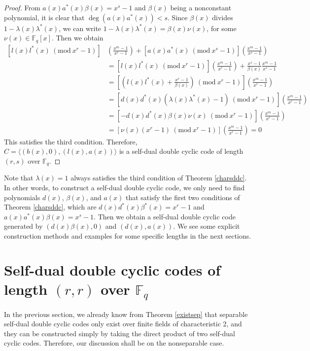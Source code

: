\documentclass[12pt]{article}
\newcommand{\Mod}[1]{\ (\mathrm{mod}\ #1)}
\begin{document}
\begin{proof}
		From $a(x)a^{*}(x)\beta(x)=x^s-1$ and $\beta(x)$ being a nonconstant polynomial, it is clear that $\deg(a(x)a^{*}(x))<s$. Since $\beta(x)$ divides $1-\lambda(x)\lambda^{*}(x)$, we can write $1-\lambda(x)\lambda^{*}(x)=\beta(x)\nu(x)$, for some $\nu(x)\in\mathbb{F}_q[x]$. Then we obtain
		\begin{align*}
			\left[l(x)l^{*}(x)\Mod{x^r-1}\right]&\left(\frac{x^m-1}{x^r-1}\right)+\left[a(x)a^{*}(x)\Mod{x^s-1}\right]\left(\frac{x^m-1}{x^s-1}\right)\\
			&=\left[l(x)l^{*}(x)\Mod{x^r-1}\right]\left(\frac{x^m-1}{x^r-1}\right)+\frac{x^s-1}{\beta(x)}\frac{x^m-1}{x^s-1}\\
			&=\left[\left(l(x)l^{*}(x)+\frac{x^r-1}{\beta(x)}\right)\Mod{x^r-1}\right]\left(\frac{x^m-1}{x^r-1}\right)\\
			&=\left[d(x)d^{*}(x)(\lambda(x)\lambda^{*}(x)-1)\Mod{x^r-1}\right]\left(\frac{x^m-1}{x^r-1}\right)\\
			&=\left[-d(x)d^{*}(x)\beta(x)\nu(x)\Mod{x^r-1}\right]\left(\frac{x^m-1}{x^r-1}\right)\\
			&=\left[\nu(x)(x^r-1)\Mod{x^r-1}\right]\left(\frac{x^m-1}{x^r-1}\right)=0
		\end{align*}
		This satisfies the third condition. Therefore, $C=\langle (b(x),0),(l(x),a(x))\rangle$ is a self-dual double cyclic code of length $(r,s)$ over $\mathbb{F}_q$.
	\end{proof}
	
	Note that $\lambda(x)=1$ always satisfies the third condition of Theorem \ref{charsddc}. In other words, to construct a self-dual double cyclic code, we only need to find polynomials $d(x)$, $\beta(x)$, and $a(x)$ that satisfy the first two conditions of Theorem \ref{charsddc}, which are $d(x)d^{*}(x)\beta^{*}(x)=x^r-1$ and $a(x)a^{*}(x)\beta(x)=x^s-1$. Then we obtain a self-dual double cyclic code generated by $(d(x)\beta(x),0)$ and $(d(x),a(x))$. We see some explicit construction methods and examples for some specific lengths in the next sections.
	
	\section{Self-dual double cyclic codes of length $(r,r)$ over $\mathbb{F}_q$}
	In the previous section, we already know from Theorem \ref{existsep} that separable self-dual double cyclic codes only exist over finite fields of characteristic 2, and they can be constructed simply by taking the direct product of two self-dual cyclic codes. Therefore, our discussion shall be on the nonseparable case.
	
\end{document}
